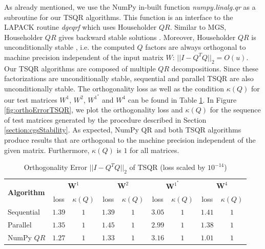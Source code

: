 \documentclass{article}
\begin{document}
As already mentioned, we use the NumPy in-built function
\textit{numpy.linalg.qr} as a subroutine for our TSQR algorithms. This function
is an interface to the LAPACK routine \textit{dgeqrf} which uses Householder
$QR$. Similar to MGS, Householder $QR$ gives backward stable solutions
\cite{Bornemann:2018}. Moreover, Householder $QR$ is unconditionally stable
\cite{Grigori:2008}, i.e. the computed $Q$ factors are always orthogonal to
machine precision independent of the input matrix $W$: $||I - Q^T Q||_2 = O(u)$.
Our TSQR algorithms are composed of multiple $QR$ decompositions. Since these
factorizations are unconditionally stable, sequential and parallel TSQR are also
unconditionally stable. The orthogonality loss as well as the condition
$\kappa(Q)$ for our test matrices $W^1$, $W^2$, $W^{1^*}$ and $W^4$ can be found
in Table \ref{tab:errorOrthoTSQR}. In Figure \ref{fig:orthoErrorTSQR}, we plot
the orthogonality loss and $\kappa(Q)$ for the sequence of test matrices
generated by the procedure described in Section \ref{section:cgsStability}. As
expected, NumPy QR and both TSQR algorithms produce results that are orthogonal
to the machine precision independent of the given matrix. Furthermore,
$\kappa(Q)$ is $1$ for all matrices.
\begin{table}[t]
    \centering
    \caption{Orthogonality Error $||I - Q^T Q||_2$ of TSQR (loss scaled by $10^{-14}$)}
    \label{tab:errorOrthoTSQR}
    \renewcommand{\arraystretch}{1.2}
    \begin{tabular}{|p{2cm}|c|c|c|c|c|c|c|c|}
      \hline
      \multirow{2}{2cm}{\textbf{Algorithm}} & \multicolumn{2}{c|}{$\textbf{W}^1$} &
      \multicolumn{2}{c|}{$\textbf{W}^2$} & \multicolumn{2}{c|}{$\textbf{W}^{1^*}$} &
      \multicolumn{2}{c|}{$\textbf{W}^4$}\\
      \cline{2-9}
      & loss & $\kappa(Q)$ & loss & $\kappa(Q)$
      & loss & $\kappa(Q)$ & loss & $\kappa(Q)$\\
      \hline
      Sequential    & $1.39$ & $1$ & $1.39$ & $1$
                        & $3.05$ & $1$ & $1.41$ & $1$ \\ \hline
      Parallel      & $1.35$ & $1$ & $1.45$ & $1$
                        & $2.99$ & $1$ & $1.38$ & $1$ \\ \hline
      NumPy $QR$    & $1.27$ & $1$ & $1.33$ & $1$
                        & $3.16$ & $1$ & $1.01$ & $1$ \\ \hline
    \end{tabular}
  \end{table}
\end{document}
